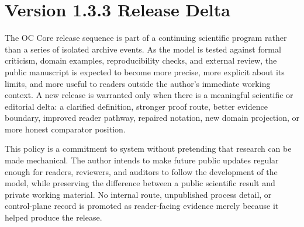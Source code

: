 \begin{abstract}
The manuscript contains the full monograph body, a compact article route, a
methods and reproducibility route, reviewer-response material, proof and
formalization sections, finite-model and numerical evidence anchors, figure and
table material, source-trace appendices, and practical-use boundaries. Figures
and tables are retained as scientific material; formulas and theorem statements
are retained in the mathematical spine; machine-readable registers remain in
the evidence package where they can be audited without becoming the narrative
structure of the manuscript.

The practical value of the release is a disciplined compression without loss of
meaning. If OC is useful, it should help a scientific reviewer, a systems
theorist, an AI builder, an enterprise architect, or an evidence auditor
translate a complex system into a common ontology while preserving the
differences that matter. The principal limitation is part of the method:
future releases must add evidence, mechanization, comparator work, or domain
validation before they widen the public claim surface. Version~1.3.3 therefore
offers a publication-grade basis for external review, not a claim that every
future scientific obligation has already been discharged.
\end{abstract}

\clearpage
\section*{Version 1.3.3 Release Delta}
The OC Core release sequence is part of a continuing scientific program rather
than a series of isolated archive events. As the model is tested against formal
criticism, domain examples, reproducibility checks, and external review, the
public manuscript is expected to become more precise, more explicit about its
limits, and more useful to readers outside the author's immediate working
context. A new release is warranted only when there is a meaningful scientific
or editorial delta: a clarified definition, stronger proof route, better
evidence boundary, improved reader pathway, repaired notation, new domain
projection, or more honest comparator position.

This policy is a commitment to system without pretending that research can be
made mechanical. The author intends to make future public updates regular
enough for readers, reviewers, and auditors to follow the development of the
model, while preserving the difference between a public scientific result and
private working material. No internal route, unpublished process detail, or
control-plane record is promoted as reader-facing evidence merely because it
helped produce the release.


